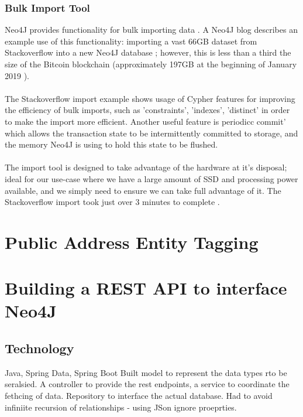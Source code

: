 \subsubsection{Bulk Import Tool}
Neo4J provides functionality for bulk importing data \cite{RefWorks:doc:5c6ab610e4b02c4a19ae3ed1}. A Neo4J blog describes an example use of this functionality: importing a  vast 66GB dataset from Stackoverflow into a new Neo4J database \cite{RefWorks:doc:5c6ab2bae4b08c9b85da964f}; however, this is less than a third the size of the Bitcoin blockchain (approximately 197GB at the beginning of January 2019 \cite{RefWorks:doc:5c6ab1a3e4b05e3aaec0ffc8}).
\\\\ 
The Stackoverflow import example shows usage of Cypher features for improving the efficiency of bulk imports, such as 'constraints', 'indexes', 'distinct'  in order to make the import more efficient. Another useful feature is periodicc commit' which allows the transaction state to be intermittently committed to storage, and the memory Neo4J is using to hold this state to be flushed. 
\\\\
The import tool is designed to take advantage of the hardware at it's disposal; ideal for our use-case where we have a large amount of SSD and processing power available, and we simply need to ensure we can take full advantage of it. The Stackoverflow import took just over 3 minutes to complete \cite{RefWorks:doc:5c6ab2bae4b08c9b85da964f}. 


\section{Public Address Entity Tagging}


\section{Building a REST API to interface Neo4J}

\subsection{Technology}
Java, Spring Data, Spring Boot
Built model to represent the data types rto be seralsied. A controller to provide the rest endpoints, a service to coordinate the fethcing of data. Repository to interface the actual database. 
Had to avoid infiniite recursion of relationships - using JSon ignore proeprties. 

